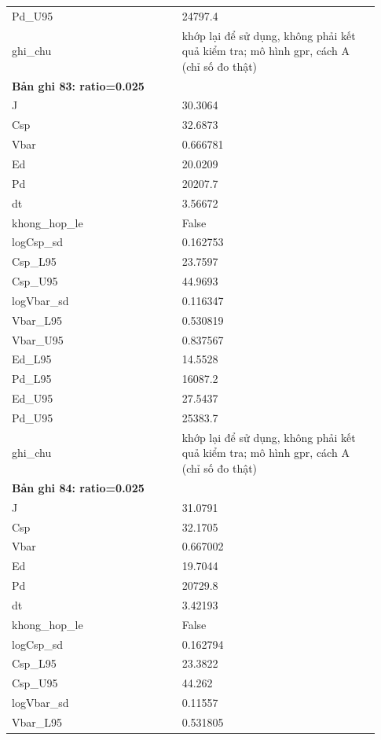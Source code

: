 \begin{longtable}{p{0.43\linewidth}p{0.50\linewidth}}
Pd\_\allowbreak U95 & 24797.4 \\
ghi\_\allowbreak chu & khớp lại để sử dụng, không phải kết quả kiểm tra; mô hình gpr, cách A (chỉ số đo thật) \\
\midrule
\multicolumn{2}{p{0.95\linewidth}}{\textbf{Bản ghi 83: ratio=0.025}} \\
J & 30.3064 \\
Csp & 32.6873 \\
Vbar & 0.666781 \\
Ed & 20.0209 \\
Pd & 20207.7 \\
dt & 3.56672 \\
khong\_\allowbreak hop\_\allowbreak le & False \\
logCsp\_\allowbreak sd & 0.162753 \\
Csp\_\allowbreak L95 & 23.7597 \\
Csp\_\allowbreak U95 & 44.9693 \\
logVbar\_\allowbreak sd & 0.116347 \\
Vbar\_\allowbreak L95 & 0.530819 \\
Vbar\_\allowbreak U95 & 0.837567 \\
Ed\_\allowbreak L95 & 14.5528 \\
Pd\_\allowbreak L95 & 16087.2 \\
Ed\_\allowbreak U95 & 27.5437 \\
Pd\_\allowbreak U95 & 25383.7 \\
ghi\_\allowbreak chu & khớp lại để sử dụng, không phải kết quả kiểm tra; mô hình gpr, cách A (chỉ số đo thật) \\
\midrule
\multicolumn{2}{p{0.95\linewidth}}{\textbf{Bản ghi 84: ratio=0.025}} \\
J & 31.0791 \\
Csp & 32.1705 \\
Vbar & 0.667002 \\
Ed & 19.7044 \\
Pd & 20729.8 \\
dt & 3.42193 \\
khong\_\allowbreak hop\_\allowbreak le & False \\
logCsp\_\allowbreak sd & 0.162794 \\
Csp\_\allowbreak L95 & 23.3822 \\
Csp\_\allowbreak U95 & 44.262 \\
logVbar\_\allowbreak sd & 0.11557 \\
Vbar\_\allowbreak L95 & 0.531805 \\

\end{longtable}
